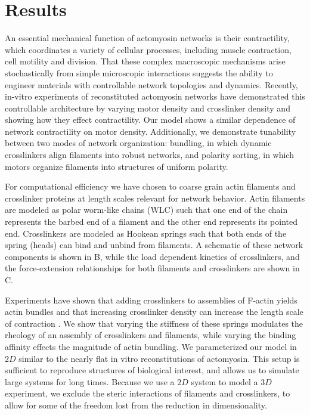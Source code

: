 \documentclass[12pt]{article}
\begin{document}
\section{Results}
An essential mechanical function of actomyosin networks is their contractility, 
which coordinates a variety of cellular processes, including muscle contraction,
cell motility and division. That these complex macroscopic mechanisms arise 
stochastically from simple microscopic interactions suggests the ability
to engineer materials with controllable network topologies and dynamics. 
Recently, in-vitro experiments of reconstituted actomyosin networks have 
demonstrated this controllable architecture by varying motor density and
crosslinker density and showing how they effect contractility\cite{murrell2012, murrell2014}. 
Our model shows a similar dependence of network contractility on motor density. 
Additionally, we demonstrate tunability between two modes  of network 
organization: bundling, in which dynamic crosslinkers align filaments into robust 
networks, and polarity sorting, in which motors organize filaments into 
structures of uniform polarity.
\par
For computational efficiency we have chosen to coarse grain actin filaments and
crosslinker proteins at length scales relevant for network behavior. Actin 
filaments are modeled as polar worm-like chains (WLC) such that one end of the 
chain represents the barbed end of a filament and the other end represents its 
pointed end. Crosslinkers are modeled as Hookean springs such that both ends of 
the spring (heads) can bind and unbind from filaments. A schematic of these 
network components is shown in B, while the load 
dependent kinetics of crosslinkers, and the force-extension relationships
for both filaments and crosslinkers are shown in C. 
\par
Experiments have shown that adding crosslinkers to assemblies of F-actin yields actin bundles 
\cite{gardel2004, murrell2012, murrell2014} and that increasing crosslinker 
density can increase the length scale of contraction \cite{murrell2012}. 
We show that varying the stiffness of these springs modulates the rheology 
of an assembly of crosslinkers and filaments, while varying the binding affinity
effects the magnitude of actin bundling. We parameterized our model in $2D$ 
similar to the nearly flat in vitro reconstitutions of actomyosin. This setup is
sufficient to reproduce structures of biological interest, and allows us to 
simulate large systems for long times. Because we use a $2D$ system to model a 
$3D$ experiment, we exclude the steric interactions of filaments and 
crosslinkers, to allow for some of the freedom lost from the reduction in 
dimensionality.
\end{document}
